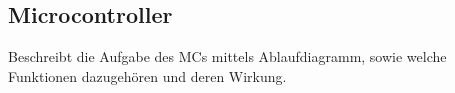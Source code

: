 \subsection{Microcontroller}\label{sec:microcontroller}

Beschreibt die Aufgabe des MCs mittels Ablaufdiagramm, sowie welche Funktionen dazugehören und deren Wirkung.